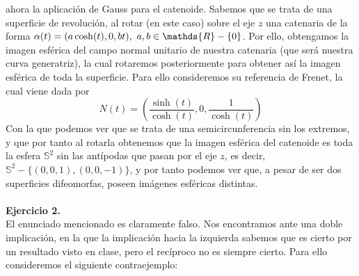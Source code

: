 \documentclass[fleqn]{article}
\def\R{\mathds{R}}
\begin{document}
    ahora la aplicación de Gauss para el catenoide. Sabemos que se trata de una superficie de revolución, al rotar (en este caso) sobre el eje $z$ una catenaria de la forma
    $\alpha(t) = (a\cosh(t), 0, bt), \thinspace \thinspace a,b\in \R-\{0\}$. Por ello, obtengamos la imagen esférica del campo normal unitario de nuestra catenaria (que será nuestra curva generatriz),
    la cual rotaremos posteriormente para obtener así la imagen esférica de toda la superficie. Para ello consideremos su referencia de Frenet, la cual viene dada por
    $$N(t) = \left(\frac{\sinh(t)}{\cosh(t)}, 0, \frac{1}{\cosh(t)} \right)$$
    Con la que podemos ver que se trata de una semicircunferencia sin los extremos, y que por tanto al rotarla obtenemos
    que la imagen esférica del catenoide es toda la esfera $\mathds{S}^2$ sin las antípodas que pasan por el eje $z$, es decir, $\mathds{S}^2 - \{(0,0,1), (0,0,-1)\}$, y por tanto podemos ver que,
    a pesar de ser dos superficies difeomorfas, poseen imágenes esféricas distintas.\\ \\

    \textbf{Ejercicio 2. } \\

    El enunciado mencionado es claramente falso. Nos encontramos ante una doble implicación, en la que la implicación hacia la izquierda sabemos que es cierto por un resultado 
    visto en clase, pero el recíproco no es siempre cierto. Para ello consideremos el siguiente contraejemplo:
\end{document}
